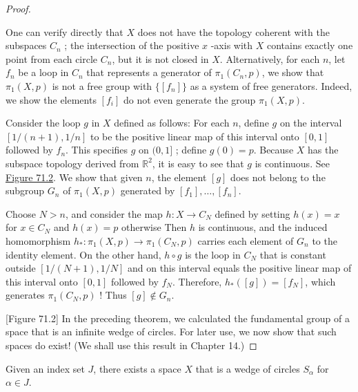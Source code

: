 \begin{proof}
\begin{centeredblock}
\begin{example}
One can verify directly that \(X\) does not have the topology coherent with the subspaces \(C_{n}\) ; the intersection of the positive \(x\) -axis with \(X\) contains exactly one point from each circle \(C_{n}\), but it is not closed in \(X\). Alternatively, for each \(n\), let \(f_{n}\) be a loop in \(C_{n}\) that represents a generator of \({\pi }_{1}( {C_{n},p})\), we show that \({\pi }_{1}( {X,p})\) is not a free group with \(\{ [ f_{n}] \}\) as a system of free generators. Indeed, we show the elements \([ f_{i}]\) do not even generate the group \({\pi }_{1}( {X,p})\).
\end{example}
\end{centeredblock}

Consider the loop \(g\) in \(X\) defined as follows: For each \(n\), define \(g\) on the interval \([ {1/( {n + 1}),1/n}]\) to be the positive linear map of this interval onto \([ {0,1}]\) followed by \(f_{n}\). This specifies \(g\) on \((0,1]\) ; define \(g( 0) = p\). Because \(X\) has the subspace topology derived from \(\mathbb{R}^{2}\), it is easy to see that \(g\) is continuous. See \hyperref[fig:71.2]{Figure 71.2}. We show that given \(n\), the element \([ g]\) does not belong to the subgroup \(G_{n}\) of \({\pi }_{1}( {X,p})\) generated by \([ f_{1}] ,\ldots ,[ f_{n}]\).

Choose \(N > n\), and consider the map \(h : X \rightarrow {C}_{N}\) defined by setting \(h(x) = x\) for \(x \in {C}_{N}\) and \(h(x) = p\) otherwise Then \(h\) is continuous, and the induced homomorphism \(h_{ * } : {\pi }_{1}( {X,p}) \rightarrow {\pi }_{1}( {C_{N},p})\) carries each element of \(G_{n}\) to the identity element. On the other hand, \(h \circ g\) is the loop in \(C_{N}\) that is constant outside \([ {1/( {N + 1}),1/N}]\) and on this interval equals the positive linear map of this interval onto \([ {0,1}]\) followed by \(f_{N}\). Therefore, \(h_{ * }( [ g] ) = [ f_{N}]\), which generates \({\pi }_{1}( {C_{N},p})\) ! Thus \([ g] \notin {G}_{n}\).

[Figure 71.2]
In the preceding theorem, we calculated the fundamental group of a space that is an infinite wedge of circles. For later use, we now show that such spaces do exist! (We shall use this result in Chapter 14.)
\end{proof}

\begin{lemma}
\label{lem:\thetheorem}
Given an index set \(J\), there exists a space \(X\) that is a wedge of circles \(S_{\alpha }\) for \(\alpha \in J\).
\end{lemma}

